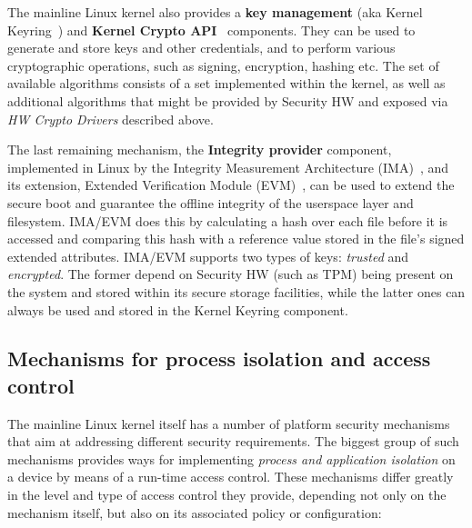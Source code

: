 The mainline Linux kernel also provides a \textbf{key management} (aka Kernel Keyring~\cite{keyrings}) and \textbf{Kernel Crypto API}~\cite{kernelcryptoapi} components. They can be used to generate and store keys and other credentials, and to perform various cryptographic operations, such as signing, encryption, hashing etc. The set of available algorithms consists of a set implemented within the kernel, as well as additional algorithms that might be provided by Security HW and exposed via \textit{HW Crypto Drivers} described above.

The last remaining mechanism, the \textbf{Integrity provider} component, implemented in Linux by the Integrity Measurement Architecture (IMA)~\cite{ima}, and its extension, Extended Verification Module (EVM)~\cite{ima}, can be used to extend the secure boot and guarantee the offline integrity of the userspace layer and filesystem. IMA/EVM does this by calculating a hash over each file before it is accessed and comparing this hash with a reference value stored in the file's signed extended attributes. IMA/EVM supports two types of keys: \textit{trusted} and \textit{encrypted}. The former depend on Security HW (such as TPM) being present on the system and stored within its secure storage facilities, while the latter ones can always be used and stored in the Kernel Keyring component. 

\subsection{Mechanisms for process isolation and access control}

The mainline Linux kernel itself has a number of platform security mechanisms that aim at addressing different security requirements. The biggest group of such mechanisms provides ways for implementing \textit{process and application isolation} on a device by means of a run-time access control. These mechanisms differ greatly in the level and type of access control they provide, depending not only on the mechanism itself, but also on its associated policy or configuration:

